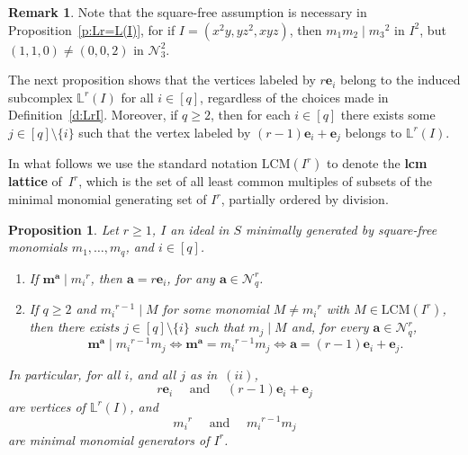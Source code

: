 \documentclass[11pt]{article}
\newtheorem{prop}[theo]{Proposition}
\theoremstyle{definition}
\newtheorem{rema}[theo]{Remark}
\numberwithin{equation}{section}
\newcommand{\N}{\mathcal{N}}
\newcommand{\Nrq}{\mathcal{N}^r_q}
\newcommand{\LCM}{\mathrm{LCM}}
\newcommand{\Lr}{\mathbb{L}^r}
\newcommand{\ba}{\mathbf{a}}
\newcommand{\be}{\mathbf{e}}
\newcommand{\bma}{\mathbf{m}^\ba}
\newcommand{\qand}{\quad \mbox{ and } \quad }
\begin{document}
\begin{rema} Note that the square-free assumption is necessary
  in Proposition~\ref{p:Lr=L(I)}, for if $I = (x^2y, yz^2, xyz)$, then $m_1m_2
  \mid {m_3}^2$ in $I^2$, but $(1, 1, 0) \neq (0,0,2)$ in
  $\N_3^2$.
\end{rema}


The next proposition shows that the vertices labeled by $r\be_i$ belong
to the induced subcomplex $\Lr(I)$ for all $i\in [q]$, regardless of
the choices made in Definition~\ref{d:LrI}. Moreover, if $q\geq 2$, then for
each $i\in [q]$ there exists some $j\in[q]\setminus \{i\}$ such that
the vertex labeled by $(r-1)\be_i + \be_j$ belongs to $\Lr(I)$.

In what follows we use the standard notation $\LCM(I^r)$ to denote the
{\bf lcm lattice} of~$I^r$, which is the set of all least common
multiples of subsets of the minimal monomial generating set of $I^r$,
partially ordered by division.

\begin{prop}\label{p:irredundant-gens-Ir}
Let $r \geq 1$, $I$ an ideal in $S$ minimally generated by square-free
monomials $m_1,\ldots,m_q$, and $i\in[q]$.
\begin{enumerate}[label=\textup{(}\roman*\textup{)}]
\item If $\bma \mid {m_i}^r$, then $\ba=r\be_i$, for any $\ba \in \Nrq$.
\item If $q \geq 2$ and ${m_i}^{r-1} \mid M$ for some monomial $M \neq {m_i}^r$ with $M \in \LCM(I^r)$, then there exists $j\in [q]\setminus \{i\}$ such that $m_j
  \mid M$ and, for every $\ba \in \Nrq$,
  $$\bma \mid {m_i}^{r-1}m_j \iff
    \bma =    {m_i}^{r-1}m_j    \iff
    \ba=(r-1)\be_i+\be_j.
  $$
\end{enumerate}

In particular, for all $i$, and all $j$ as in~$(ii)$,
$$r\be_i \qand (r-1)\be_i+\be_j$$ are vertices of $\Lr(I)$, and
$${m_i}^r \qand {m_i}^{r-1}m_j$$ are minimal monomial
generators of $I^r$.
\end{prop}
\end{document}
